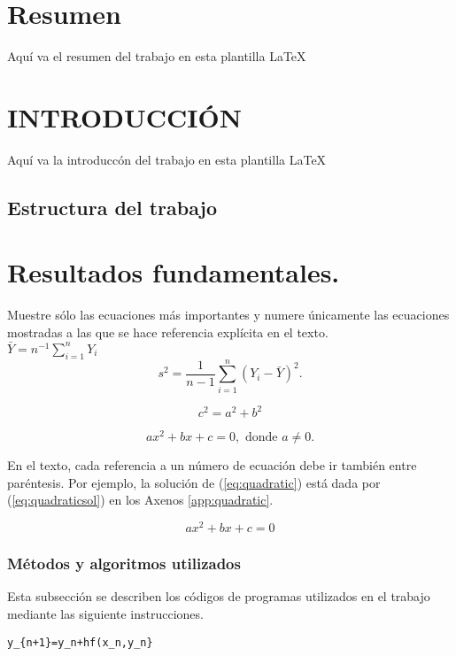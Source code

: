 \documentclass{wscpaperproc}
\theoremstyle{wsc}
\begin{document}
\section*{Resumen}
Aqu\'i va el resumen del trabajo en esta plantilla  \LaTeX\ 

\section{INTRODUCCI\'ON}
\label{sec:intro}
Aqu\'i va la introducc\'on del trabajo en esta plantilla  \LaTeX\ 
\subsection{Estructura del trabajo}

\section{Resultados fundamentales.}

Muestre s\'olo las ecuaciones m\'as importantes y numere \'unicamente las ecuaciones mostradas a las que se hace referencia expl\'icita en el texto. \\

$\bar Y = n^{-1} \sum_{i=1}^n Y_i$\\
$$s^2 = \frac 1 {n-1} \sum_{i=1}^n (Y_i - \bar Y)^2.$$

\[
 c^2=a^2+b^2
\]

\begin{equation}\label{eq:quadratic}
ax^2 + bx + c = 0, \mbox{ donde } a \ne 0.
\end{equation}

En el texto, cada referencia a un n\'umero de ecuaci\'on debe ir tambi\'en entre par\'entesis. Por ejemplo, la soluci\'on de (\ref{eq:quadratic}) est\'a dada por  (\ref{eq:quadraticsol}) en los Axenos \ref{app:quadratic}.


\begin{equation} \label{eq:quadratic_second}
ax^2 + bx + c = 0
\end{equation}

\subsubsection{M\'etodos y algoritmos utilizados}
Esta  subsecci\'on se describen los c\'odigos de programas utilizados en el trabajo mediante las siguiente instrucciones.

\begin{verbatim}
y_{n+1}=y_n+hf(x_n,y_n}
\end{verbatim}
\end{document}
